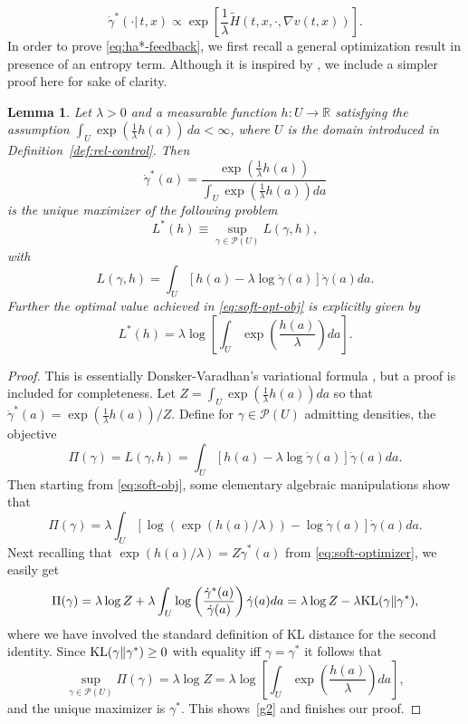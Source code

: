\documentclass[12pt,reqno]{amsart}
\numberwithin{equation}{section}  %
\newcommand{\1}{{\bf 1}}
\newcommand{\2}{{\bf 2}}
\newcommand{\R}{\mathbb R}
\newcommand{\cp}{\mathcal P}
\newcommand{\ga}{\gamma}
\newcommand{\la}{\lambda}
\newcommand{\lp}{\left(}
\newcommand{\rp}{\right)}
\newcommand{\lc}{\left[}
\newcommand{\rc}{\right]}
\newtheorem{lemma}[theorem]{Lemma}
\theoremstyle{remark}
\theoremstyle{remark}
\newcommand{\beq}{\begin{equation}}
\newcommand{\eeq}{\end{equation}}
\begin{document}
\beq\label{eq:ha*-feedback}
	\dot{\gamma}^*(\cdot|\, t,x) \propto \exp \left[\dfrac{1}{\lambda} \tilde H(t,x,\cdot,\nabla v(t,x) ) \right].
\eeq
In order to prove \eqref{eq:ha*-feedback}, we first recall a general optimization result in presence of an entropy term. Although it is inspired by \cite[Lemma~2]{jia2023qlearning}, we include a simpler proof here for sake of clarity.
 \begin{lemma}\label{lem:opt-gibbs}
 Let $\la > 0$ and a measurable function $h: U \to \R$ satisfying the assumption $\int_{U} \exp(\frac{1}{\la}h(a)) \, da < \infty$, where $U$ is the domain introduced in Definition~\ref{def:rel-control}. Then 
 \beq\label{eq:soft-optimizer} 
 \dot{\ga}^{\ast}(a) = \dfrac{\exp(\frac{1}{\la}h(a))}{\int_U \exp(\frac{1}{\la}h(a)) da}
 \eeq 
 is the unique maximizer of the following problem
 \beq\label{eq:soft-opt-obj}
 L^{\ast}(h) \equiv \sup_{\ga \in \cp(U)} L(\ga, h),
 \eeq
 with
 \beq\label{eq:L}
 L(\ga, h) = \int_U \lc h(a) - \la \log \dot\ga (a) \rc \dot \ga(a) da.
 \eeq
 Further the optimal value achieved in \eqref{eq:soft-opt-obj} is explicitly given by
 \begin{equation}\label{g2}
 L^{\ast}(h) = \la \log \lc \int_U \exp \lp \frac{h(a)}{\la} \rp da \rc.
 \end{equation}
 \end{lemma}
 \begin{proof}
This is essentially Donsker-Varadhan's variational formula \cite{donsker-varadhan1983}, but a proof is included for completeness. 
Let $Z = \int_U \exp(\frac{1}{\la}h(a)) da$ so that $\dot\ga^{\ast}(a) = \exp(\frac{1}{\la} h(a))/Z$. Define for $\ga \in \cp(U)$ admitting densities, the objective
\beq\label{eq:soft-obj}
\Pi(\ga)= L(\ga,h) = \int_U \lc h(a) - \la \log \dot\ga (a) \rc \dot \ga(a) da.
\eeq
Then starting from \eqref{eq:soft-obj}, some elementary algebraic manipulations show that
$$
\Pi(\ga) = \la \int_U \lc \log(\exp(h(a)/\la)) - \log \dot\ga (a) \rc \dot \ga(a) da.
$$
Next recalling that $\exp(h(a)/\la) = Z \dot\ga^{\ast}(a)$ from \eqref{eq:soft-optimizer}, we easily get
$$
\Pi(\ga) = \la \log Z + \la \int_U \log \lp \dfrac{\dot{\ga}^{\ast}(a)}{\dot\ga (a)} \rp \dot \ga(a) da
 = \la \log Z - \la \textnormal{KL}(\ga \| \ga^{\ast}),
$$
where we have involved the standard definition of KL distance for the second identity.
Since $\textnormal{KL}(\ga \| \ga^{\ast}) \geq 0$ with equality iff $\ga = \ga^{\ast}$ it follows that
$$
\sup_{\ga \in \cp(U)} \Pi(\ga) = \la \log Z
= \la \log \lc \int_U \exp \lp \frac{h(a)}{\la} \rp da \rc,
$$
and the unique maximizer is $\ga^{\ast}$. This shows~\eqref{g2} and finishes our proof.
\end{proof}
\end{document}
